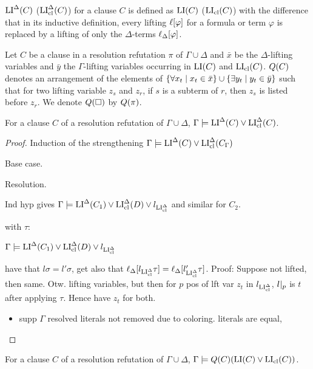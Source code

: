 \documentclass[,%
	draft=false,%
	numbers=noendperiod
	11pt,
	a4paper,
	oneside,%
	openany,
]{memoir}
\begin{document}
\begin{defi}
	$\operatorname{LI}^\Delta(C)$ ($\operatorname{LI}_{\operatorname{cl}}^\Delta(C)$) for a clause $C$ is defined as $\operatorname{LI}(C)$ ($\operatorname{LI}_{\operatorname{cl}}(C)$) with the difference that in its inductive definition, every lifting $\ell[\varphi]$ for a formula or term $\varphi$ is replaced by a lifting of only the $\Delta$-terms $\ell_{\Delta}[\varphi]$.
\end{defi}

\begin{defi}
	\label{def:arrow_quantifier_block}
	Let $C$ be a clause in a resolution refutation $\pi$ of $\Gamma\cup\Delta$
	and $\bar x$ be the $\Delta$-lifting variables and $\bar y$ the $\Gamma$-lifting variables occurring in $\operatorname{LI}(C)$ and $\operatorname{LI}_{\operatorname{cl}}(C)$.
	$Q(C)$ denotes an arrangement of the elements of  $\{ \forall x_t \mid\nolinebreak x_t \in \bar x\} \cup \{ \exists y_t \mid y_t \in \bar y\}$ such that for two lifting variable $z_s$ and $z_r$, if $s$ is a subterm of $r$, then $z_s$ is listed before $z_r$.
	We denote $Q(\square)$ by $Q(\pi)$.
\end{defi}


\begin{clemma}
	For a clause $C$ of a resolution refutation of $\Gamma\cup\Delta$, 
	$\Gamma\models \operatorname{LI}^\Delta(C) \lor \operatorname{LI}_{\operatorname{cl}}^\Delta(C)$.
\end{clemma}
\begin{proof}
	Induction of the strengthening $\Gamma\models \operatorname{LI}^\Delta(C) \lor \operatorname{LI}_{\operatorname{cl}}^\Delta(C_\Gamma)$

	\begin{description}
		\item{} Base case.
			\checkmark
		\item{} Resolution.

			Ind hyp gives $\Gamma \models \operatorname{LI}^\Delta(C_1)  \lor \operatorname{LI}_{\operatorname{cl}}^\Delta(D) \lor l_{\operatorname{LI}_{\operatorname{cl}}^\Delta} $
			and similar for $C_2$.

			with $\tau$:

			$\Gamma \models \operatorname{LI}^\Delta(C_1)  \lor \operatorname{LI}_{\operatorname{cl}}^\Delta(D) \lor l_{\operatorname{LI}_{\operatorname{cl}}^\Delta}$

			have that $l\sigma = l'\sigma$, get also that $\ell_{\Delta}[l_{\operatorname{LI}_{\operatorname{cl}}^\Delta} \tau] = \ell_{\Delta}[l'_{\operatorname{LI}_{\operatorname{cl}}^\Delta} \tau]$. Proof:
			Suppose not lifted, then same. Otw. lifting variables, but then for $p$ pos of lft var $z_t$ in $l_{\operatorname{LI}_{\operatorname{cl}}^\Delta}$, $l|_{p}$ is $t$ after applying $\tau$.
			Hence have $z_t$ for both.



			\begin{itemize}
				\item supp $\Gamma$
					resolved literals not removed due to coloring. literals are equal, 
			\end{itemize}


	\end{description}
\end{proof}

\clearpage



\begin{clemma}
	For a clause $C$ of a resolution refutation of $\Gamma\cup\Delta$, 
	$\Gamma\models Q(C)(\operatorname{LI}(C) \lor \operatorname{LI}_{\operatorname{cl}}(C))$.
\end{clemma}
\end{document}
